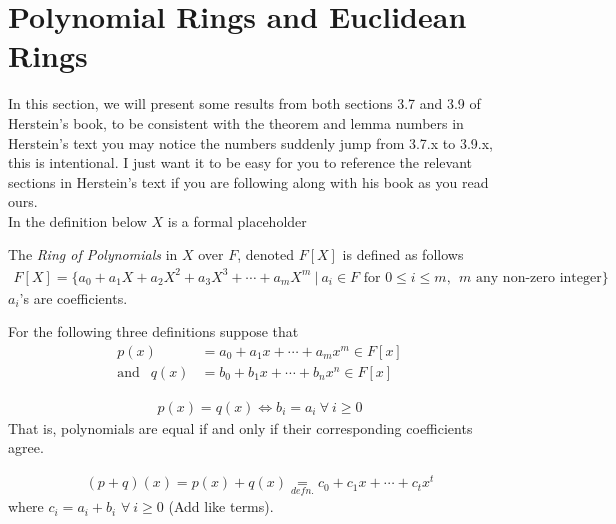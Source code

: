 \section{Polynomial Rings and Euclidean Rings}
In this section,  we will present some results from both sections 3.7 and 3.9 of Herstein's book, to be consistent with the theorem and lemma numbers in Herstein's text you may notice the numbers suddenly jump from 3.7.x to 3.9.x, this is intentional. I just want it to be easy for you to reference the relevant sections in Herstein's text if you are following along with his book as you read ours. \\
\newpage 
\noindent In the definition below $X$ is a formal placeholder
\begin{definition}
    The \textit{Ring of Polynomials} in $X$ over $F$, denoted $F[X]$ is defined as follows
    \begin{align}
        F[X]= \{a_0 + a_1X + a_2X^2 + a_3X^3 + \cdots + a_m X^m \ | \ a_i \in F \text{ for } 0\leq i \leq m, \ \ m \text{ any non-zero integer}\} \nonumber
    \end{align}
    $a_i$'s are coefficients.
\end{definition}

\noindent For the following three definitions suppose that
\begin{align}
    p(x)&= a_0 + a_1x + \cdots + a_mx^m \in F[x] \nonumber \\
    \text{and } \ \ q(x)&= b_0+b_1x+\cdots + b_n x^n \in F[x] \nonumber
\end{align}

\begin{definition}
    \begin{align}
        p(x)=q(x) \iff b_i = a_i \ \forall \ i \geq 0 \nonumber 
    \end{align}
    That is, polynomials are equal if and only if their corresponding coefficients agree.
\end{definition}

\begin{definition}
    \begin{align}
        (p+q)(x)= p(x)+q(x) \underset{defn.}{=}c_0 + c_1x + \cdots + c_t x^t \nonumber
    \end{align}
    where $c_i = a_i+b_i$ $\forall \ i\geq 0$ (Add like terms).
\end{definition}

